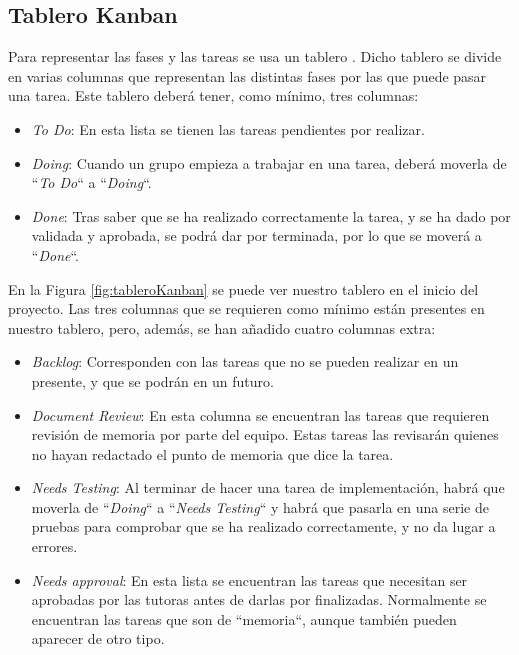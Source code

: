 \subsection{Tablero Kanban}
	
	Para representar las fases y las tareas se usa un tablero \kanban. Dicho tablero se divide en varias columnas que representan las distintas fases por las que puede pasar una tarea. Este tablero deber\'a tener, como m\'inimo, tres columnas:
	
	\begin{itemize}
		\item \textit{To Do}: En esta lista se tienen las tareas pendientes por realizar.
		\item \textit{Doing}: Cuando un grupo empieza a trabajar en una tarea, deber\'a moverla de ``\textit{To Do}`` a ``\textit{Doing}``.
		\item \textit{Done}: Tras saber que se ha realizado correctamente la tarea, y se ha dado por validada y aprobada, se podr\'a dar por terminada, por lo que se mover\'a a ``\textit{Done}``.
	\end{itemize}
	
	En la Figura \ref{fig:tableroKanban} se puede ver nuestro tablero \kanban \space en el inicio del proyecto. Las tres columnas que se requieren como m\'inimo est\'an presentes en nuestro tablero, pero, adem\'as, se han a\~{n}adido cuatro columnas extra:
	
	\begin{itemize}
		\item \textit{Backlog}: Corresponden con las tareas que no se pueden realizar en un presente, y que se podr\'an en un futuro.
		\item \textit{Document Review}: En esta columna se encuentran las tareas que requieren revisi\'on de memoria por parte del equipo. Estas tareas las revisar\'an quienes no hayan redactado el punto de memoria que dice la tarea.
		\item \textit{Needs Testing}: Al terminar de hacer una tarea de implementaci\'on, habr\'a que moverla de ``\textit{Doing}`` a ``\textit{Needs Testing}`` y habr\'a que pasarla en una serie de pruebas para comprobar que se ha realizado correctamente, y no da lugar a errores.
		\item \textit{Needs approval}: En esta lista se encuentran las tareas que necesitan ser aprobadas por las tutoras antes de darlas por finalizadas. Normalmente se encuentran las tareas que son de ``memoria``, aunque tambi\'en pueden aparecer de otro tipo.
	\end{itemize}
	
